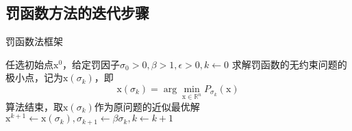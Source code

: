 \documentclass[a4paper]{D:/repositories/MyDGP/latex/PaperReadingLog}
\begin{document}
\subsection{罚函数方法的迭代步骤}
\begin{algorithm}[H]
	\caption{罚函数法框架}
	\begin{algorithmic}[1]
		\STATE 任选初始点$\mathrm{x}^0$，给定罚因子$\sigma_0>0,\beta>1,\epsilon>0,k\leftarrow 0$
            \STATE 求解罚函数的无约束问题的极小点，记为$\mathrm{x}(\sigma_k)$，即
            $$
            \mathrm{x}(\sigma_k)=\arg\min_{\mathrm{x}\in\mathbb{R}^n}P_{\sigma_k}(\mathrm{x})
            $$
                \STATE 算法结束，取$\mathrm{x}(\sigma_k)$作为原问题的近似最优解
            \ELSE
                \STATE $\mathrm{x}^{k+1}\leftarrow \mathrm{x}(\sigma_k),\sigma_{k+1}\leftarrow\beta\sigma_k,k\leftarrow k+1$
            \ENDIF
        \ENDWHILE
	\end{algorithmic}
\end{algorithm}
\end{document}
